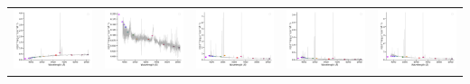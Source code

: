 \begin{center}
\begin{longtable}{l l l l l }
    \includegraphics[width=0.2\linewidth, clip]{Figs/Figs-sdss/spec-0289-51990-0542-SPLUS-n01s28-027608.pdf} & \includegraphics[width=0.2\linewidth, clip]{Figs/Figs-sdss/spec-0327-52294-0620-SPLUS-n02s19-022704.pdf} & \includegraphics[width=0.2\linewidth, clip]{Figs/Figs-sdss/spec-0329-52056-0529-SPLUS-n02s20-017833.pdf} & \includegraphics[width=0.2\linewidth, clip]{Figs/Figs-sdss/spec-0330-52370-0072-SPLUS-n03s22-026437.pdf} & \includegraphics[width=0.2\linewidth, clip]{Figs/Figs-sdss/spec-0330-52370-0131-SPLUS-n03s21-001338.pdf} \\

\end{longtable}
\end{center}
